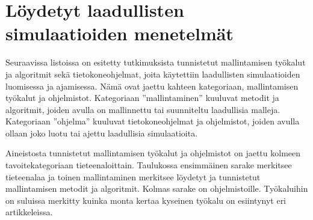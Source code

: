 \documentclass[utf8]{gradu3}
\begin{document}
\section{Löydetyt laadullisten simulaatioiden menetelmät} \label{tyokalut}
Seuraavissa listoissa on esitetty tutkimuksista tunnistetut mallintamisen työkalut 
ja algoritmit sekä tietokoneohjelmat,
joita käytettiin laadullisten simulaatioiden luomisessa ja ajamisessa. 
Nämä ovat jaettu kahteen kategoriaan, mallintamisen työkalut 
ja ohjelmistot. 
Kategoriaan ''mallintaminen'' kuuluvat metodit ja algoritmit,
joiden avulla on mallinnettu tai suunniteltu laadullisia malleja.
Kategoriaan ''ohjelma'' kuuluvat tietokoneohjelmat ja ohjelmistot, 
joiden avulla ollaan joko luotu tai ajettu laadullisia simulaatioita.

Aineistosta tunnistetut mallintamisen työkalut ja ohjelmistot on jaettu kolmeen
tavoitekategoriaan tieteenaloittain. Taulukossa ensimmäinen sarake merkitsee
tieteenalaa  ja toinen mallintaminen merkitsee löydetyt ja tunnistetut 
mallintamisen metodit ja algoritmit. Kolmas sarake on ohjelmistoille. 
Työkaluihin on suluissa merkitty 
kuinka monta kertaa kyseinen työkalu on esiintynyt eri artikkeleissa.
\end{document}
